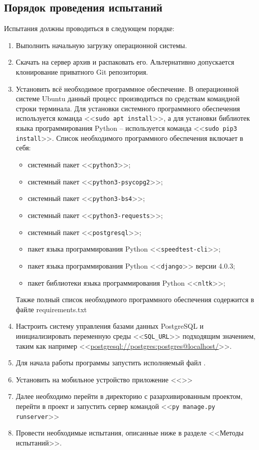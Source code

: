 \documentclass[a4paper,12pt]{article}
\begin{document}
  \subsection{Порядок проведения испытаний}
  Испытания должны проводиться в следующем порядке:
  \begin{enumerate}
    \item Выполнить начальную загрузку операционной системы.
    \item Скачать на сервер архив \CRTzip{} и распаковать его. Альтернативно допускается клонирование приватного Git репозитория.
    \item Установить всё необходимое программное обеспечение.
      В операционной системе Ubuntu данный процесс производиться по средствам командной строки терминала.
      Для установки системного программного обеспечения используется команда <<\texttt{sudo apt install}>>,
      а для установки библиотек языка программирования Python -- используется команда <<\texttt{sudo pip3 install}>>.
      Список необходимого программного обеспечения включает в себя:
      \begin{itemize}
        \item системный пакет <<\texttt{python3}>>;
        \item системный пакет <<\texttt{python3-psycopg2}>>;
        \item системный пакет <<\texttt{python3-bs4}>>;
        \item системный пакет <<\texttt{python3-requests}>>;
        \item системный пакет <<\texttt{postgresql}>>;
        \item пакет языка программирования Python <<\texttt{speedtest-cli}>>;
        \item пакет языка программирования Python <<\texttt{django}>> версии 4.0.3;
        \item пакет библиотеки языка программирования Python <<\texttt{nltk}>>;
      \end{itemize}
      Также полный список необходимого программного обеспечения содержится в файле requirements.txt
    \item Настроить систему управления базами данных PostgreSQL и инициализировать переменную среды <<\texttt{SQL\_URL}>> подходящим значением, таким как например <<\url{postgresql://postgres:postgres@localhost/}>>.
    \item Для начала работы программы запустить исполняемый файл \CRTexe{}.
    \item Установить на мобильное устройство приложение <<\CRTname>>
    \item Далее необходимо перейти в директорию с разархивированным проектом, перейти в проект и запустить сервер командой <<\texttt{py manage.py runserver}>>
    \item Провести необходимые испытания, описанные ниже в разделе <<Методы испытаний>>.
  \end{enumerate}
\end{document}
